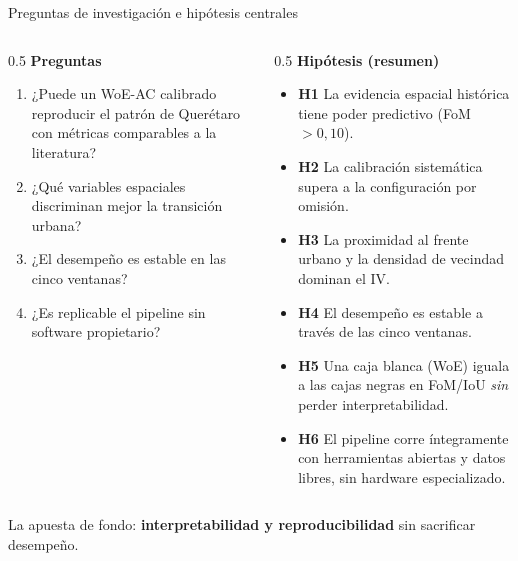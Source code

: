 \documentclass[aspectratio=169,11pt]{beamer}
\begin{document}
\begin{frame}{Preguntas de investigación e hipótesis centrales}
  \begin{columns}[T]
    \begin{column}{0.5\textwidth}
      \textbf{\textcolor{UNAMBlue}{Preguntas}}
      \footnotesize
      \begin{enumerate}
        \item ¿Puede un WoE-AC calibrado reproducir el patrón de Querétaro con métricas comparables a la literatura?
        \item ¿Qué variables espaciales discriminan mejor la transición urbana?
        \item ¿El desempeño es estable en las cinco ventanas?
        \item ¿Es replicable el pipeline sin software propietario?
      \end{enumerate}
    \end{column}
    \begin{column}{0.5\textwidth}
      \textbf{\textcolor{UNAMBlue}{Hipótesis (resumen)}}
      \scriptsize
      \begin{itemize}
        \item \textbf{H1} La evidencia espacial histórica tiene poder predictivo (FoM $>0{,}10$).
        \item \textbf{H2} La calibración sistemática supera a la configuración por omisión.
        \item \textbf{H3} La proximidad al frente urbano y la densidad de vecindad dominan el IV.
        \item \textbf{H4} El desempeño es estable a través de las cinco ventanas.
        \item \textbf{H5} Una caja blanca (WoE) iguala a las cajas negras en FoM/IoU \emph{sin} perder interpretabilidad.
        \item \textbf{H6} El pipeline corre íntegramente con herramientas abiertas y datos libres, sin hardware especializado.
      \end{itemize}
    \end{column}
  \end{columns}
  \vspace{0.15cm}
  \begin{exampleblock}{}
    \centering\footnotesize La apuesta de fondo: \textbf{interpretabilidad y reproducibilidad} sin sacrificar desempeño.
  \end{exampleblock}
\end{frame}
\end{document}
